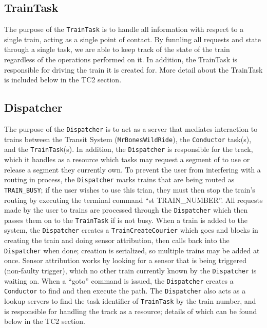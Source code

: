 \documentclass[12pt]{article}
\begin{document}
\subsection{TrainTask}
The purpose of the \texttt{TrainTask} is to handle all information with respect
to a single train, acting as a single point of contact. By funnling all requests
and state through a single task, we are able to keep track of the state of the
train regardless of the operations performed on it. In addition, the TrainTask
is responsible for driving the train it is created for. More detail about
the TrainTask is included below in the TC2 section.
\\[1\baselineskip]
\subsection{Dispatcher}
The purpose of the \texttt{Dispatcher} is to act as a server that mediates interaction to trains between the Transit System (\texttt{MrBonesWildRide}), the \texttt{Conductor} task(s), and the \texttt{TrainTask}(s).  In addition, the \texttt{Dispatcher} is responsible for the track, which it handles as a resource which tasks may request a segment of to use or release a segment they currently own.  To prevent the user from interfering with a routing in process, the \texttt{Dispatcher} marks trains that are being routed as \texttt{TRAIN\_BUSY}; if the user wishes to use this trian, they must then stop the train's routing by executing the terminal command ``st TRAIN\_NUMBER''.  All requests made by the user to trains are processed through the \texttt{Dispatcher} which then passes them on to the \texttt{TrainTask} if is not busy.  When a train is added to the system, the \texttt{Dispatcher} creates a \texttt{TrainCreateCourier} which goes and blocks in creating the train and doing sensor attribution, then calls back into the \texttt{Dispatcher} when done; creation is serialized, so multiple trains may be added at once.  Sensor attribution works by looking for a sensor that is being triggered (non-faulty trigger), which no other train currently known by the \texttt{Dispatcher} is waiting on.  When a ``goto'' command is issued, the \texttt{Dispatcher} creates a \texttt{Conductor} to find and then execute the path.  The \texttt{Dispatcher} also acts as a lookup servers to find the task identifier of \texttt{TrainTask} by the train number, and is responsible for handling the track as a resource; details of which can be found below in the TC2 section.
\\[1\baselineskip]
\end{document}
